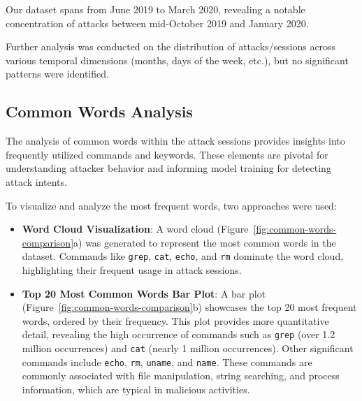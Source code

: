        
        Our dataset spans from June 2019 to March 2020, revealing a notable concentration of attacks between mid-October 2019 and January 2020.

        Further analysis was conducted on the distribution of attacks/sessions across various temporal dimensions (months, days of the week, etc.), but no significant patterns were identified.
        

    \subsection{Common Words Analysis}
    
        The analysis of common words within the attack sessions provides insights into frequently utilized commands and keywords. These elements are pivotal for understanding attacker behavior and informing model training for detecting attack intents. 

        To visualize and analyze the most frequent words, two approaches were used: 

        \begin{itemize}
        
            \item \textbf{Word Cloud Visualization}: A word cloud (Figure~\ref{fig:common-words-comparison}a) was generated to represent the most common words in the dataset. Commands like \texttt{grep}, \texttt{cat}, \texttt{echo}, and \texttt{rm} dominate the word cloud, highlighting their frequent usage in attack sessions.
            
            \vspace{0.2em}

            \item \textbf{Top 20 Most Common Words Bar Plot}: A bar plot (Figure~\ref{fig:common-words-comparison}b) showcases the top 20 most frequent words, ordered by their frequency. This plot provides more quantitative detail, revealing the high occurrence of commands such as \texttt{grep} (over 1.2 million occurrences) and \texttt{cat} (nearly 1 million occurrences). Other significant commands include \texttt{echo}, \texttt{rm}, \texttt{uname}, and \texttt{name}. These commands are commonly associated with file manipulation, string searching, and process information, which are typical in malicious activities.
            
        \end{itemize}

